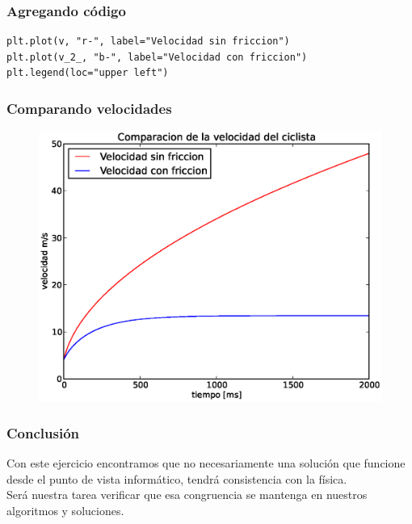 \begin{frame}[fragile]
\frametitle{Agregando código}
\begin{lstlisting}[caption=Para la gráfica, style=FormattedNumber, basicstyle=\linespread{1.1}\ttfamily=\small, columns=fullflexible]
plt.plot(v, "r-", label="Velocidad sin friccion")
plt.plot(v_2_, "b-", label="Velocidad con friccion")
plt.legend(loc="upper left")
\end{lstlisting}
\end{frame}
\begin{frame}
\frametitle{Comparando velocidades}
\begin{figure}
	\centering
	\includegraphics[scale=0.5]{EjerBicicleta02.eps}
\end{figure}
\end{frame}
\begin{frame}
\frametitle{Conclusión}
Con este ejercicio encontramos que no necesariamente una solución que funcione desde el punto de vista informático, tendrá consistencia con la física.
\\
\bigskip
Será nuestra tarea verificar que esa congruencia se mantenga en nuestros algoritmos y soluciones.
\end{frame}
